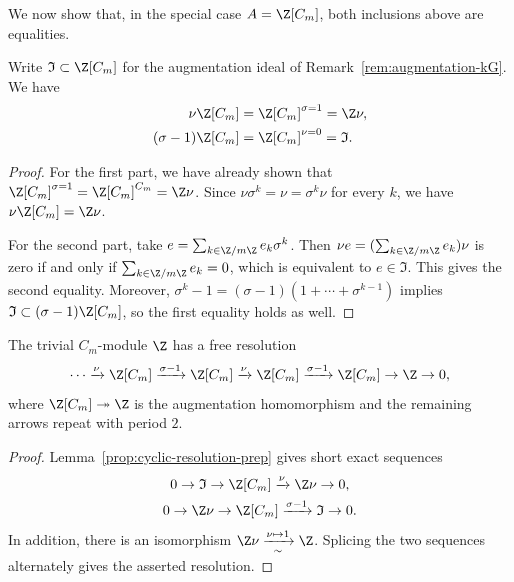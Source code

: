 We now show that, in the special case $A=\Z[C_m]$, both inclusions above are
equalities.

\begin{lemma}\label{prop:cyclic-resolution-prep}
	Write $\mathfrak{I}\subset\Z[C_m]$ for the augmentation ideal of
	Remark~\ref{rem:augmentation-kG}. We have
	\begin{align*}
		\nu\Z[C_m]&=\Z[C_m]^{\sigma=1}=\Z\nu,\\
		(\sigma-1)\Z[C_m]&=\Z[C_m]^{\nu=0}=\mathfrak{I}.
	\end{align*}
\end{lemma}
\begin{proof}
	For the first part, we have already shown that
	$\Z[C_m]^{\sigma=1}=\Z[C_m]^{C_m}=\Z\nu$. Since
	$\nu\sigma^k=\nu=\sigma^k\nu$ for every $k$, we have
	$\nu\Z[C_m]=\Z\nu$.

	For the second part, take
	$e=\sum_{k\in\Z/m\Z}e_k\sigma^k$. Then
	$\nu e=(\sum_{k\in\Z/m\Z}e_k)\nu$ is zero if and only if
	$\sum_{k\in\Z/m\Z}e_k=0$, which is equivalent to
	$e\in\mathfrak{I}$. This gives the second equality. Moreover,
	$\sigma^k-1=(\sigma-1)(1+\cdots+\sigma^{k-1})$ implies
	$\mathfrak{I}\subset(\sigma-1)\Z[C_m]$, so the first equality holds as
	well.
\end{proof}

\begin{lemma}\label{prop:cyclic-resolution}
	The trivial $C_m$-module $\Z$ has a free resolution
	\[ \cdots\xrightarrow{\nu}\Z[C_m]\xrightarrow{\sigma-1}\Z[C_m]
	\xrightarrow{\nu}\Z[C_m]\xrightarrow{\sigma-1}\Z[C_m]
	\to\Z\to0, \]
	where $\Z[C_m]\twoheadrightarrow\Z$ is the augmentation homomorphism and
	the remaining arrows repeat with period $2$.
\end{lemma}
\begin{proof}
	Lemma~\ref{prop:cyclic-resolution-prep} gives short exact sequences
	\begin{gather*}
		0\to\mathfrak{I}\to\Z[C_m]\xrightarrow{\nu}\Z\nu\to0,\\
		0\to\Z\nu\to\Z[C_m]\xrightarrow{\sigma-1}\mathfrak{I}\to0.
	\end{gather*}
	In addition, there is an isomorphism
	$\Z\nu\xrightarrow[\sim]{\nu\mapsto1}\Z$. Splicing the two sequences
	alternately gives the asserted resolution.
\end{proof}


